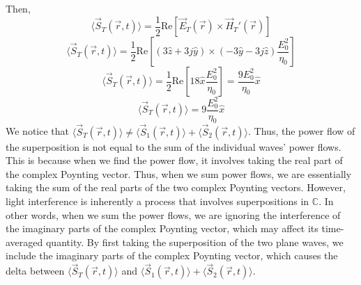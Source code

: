 \documentclass[12pt]{article}
\begin{document}
\begin{enumerate}
\begin{enumerate}
		Then,
		\[\langle \vec S_T(\vec r, t)\rangle = \frac{1}{2}\mathrm{Re}\left[\vec E_T(\vec r)\times \vec H_T'(\vec r)\right]\]
		\[\langle \vec S_T(\vec r, t)\rangle = \frac{1}{2}\mathrm{Re}\left[(3\hat z + 3j\hat y)\times (-3\hat y - 3j\hat z)\frac{E_0^2}{\eta_0}\right]\]
		\[\langle \vec S_T(\vec r, t)\rangle = \frac{1}{2}\mathrm{Re}\left[18\hat x \frac{E_0^2}{\eta_0}\right]=\frac{9E_0^2}{\eta_0}\hat x\]
		\[\boxed{\langle \vec S_T(\vec r, t)\rangle = 9\frac{E_0^2}{\eta_0}\hat x}\]
		We notice that $\langle \vec S_T(\vec r, t)\rangle \neq \langle \vec S_1(\vec r, t)\rangle + \langle \vec S_2(\vec r, t)\rangle$.
		Thus, the power flow of the superposition is not equal to the sum of the individual waves' power flows.
		This is because when we find the power flow, it involves taking the real part of the complex Poynting vector.
		Thus, when we sum power flows, we are essentially taking the sum of the real parts of the two complex Poynting vectors.
		However, light interference is inherently a process that involves superpositions in $\mathbb{C}$.
		In other words, when we sum the power flows, we are ignoring the interference of the imaginary parts of the complex Poynting vector, which may affect its time-averaged quantity.
		By first taking the superposition of the two plane waves, we include the imaginary parts of the complex Poynting vector, which causes the delta between $\langle \vec S_T(\vec r, t)\rangle$ and $\langle \vec S_1(\vec r,t)\rangle+\langle \vec S_2(\vec r,t)\rangle$.


	\end{enumerate}


\end{enumerate}
\end{document}
